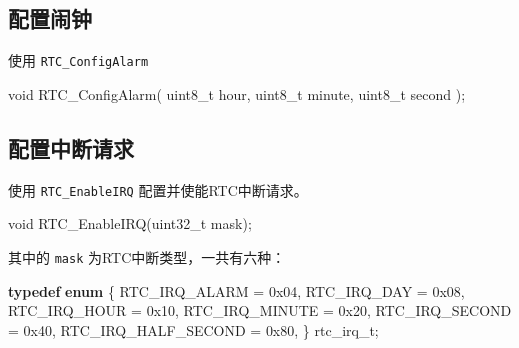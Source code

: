 \documentclass[
  12pt,
]{book}
\newenvironment{Shaded}{\begin{snugshade}}{\end{snugshade}}
\newcommand{\BaseNTok}[1]{\textcolor[rgb]{0.00,0.00,0.81}{#1}}
\newcommand{\DataTypeTok}[1]{\textcolor[rgb]{0.13,0.29,0.53}{#1}}
\newcommand{\KeywordTok}[1]{\textcolor[rgb]{0.13,0.29,0.53}{\textbf{#1}}}
\newcommand{\NormalTok}[1]{#1}
\begin{document}
\hypertarget{ux914dux7f6eux95f9ux949f}{%
\subsection{配置闹钟}\label{ux914dux7f6eux95f9ux949f}}

使用 \texttt{RTC\_ConfigAlarm}

\begin{Shaded}
\begin{Highlighting}[]
\DataTypeTok{void}\NormalTok{ RTC_ConfigAlarm(}
  \DataTypeTok{uint8_t}\NormalTok{ hour, }
  \DataTypeTok{uint8_t}\NormalTok{ minute, }
  \DataTypeTok{uint8_t}\NormalTok{ second}
\NormalTok{  );}
\end{Highlighting}
\end{Shaded}

\hypertarget{ux914dux7f6eux4e2dux65adux8bf7ux6c42-1}{%
\subsection{配置中断请求}\label{ux914dux7f6eux4e2dux65adux8bf7ux6c42-1}}

使用 \texttt{RTC\_EnableIRQ} 配置并使能RTC中断请求。

\begin{Shaded}
\begin{Highlighting}[]
\DataTypeTok{void}\NormalTok{ RTC_EnableIRQ(}\DataTypeTok{uint32_t}\NormalTok{ mask);}
\end{Highlighting}
\end{Shaded}

其中的 \texttt{mask} 为RTC中断类型，一共有六种：

\begin{Shaded}
\begin{Highlighting}[]
\KeywordTok{typedef} \KeywordTok{enum}
\NormalTok{\{}
\NormalTok{    RTC_IRQ_ALARM = }\BaseNTok{0x04}\NormalTok{,}
\NormalTok{    RTC_IRQ_DAY = }\BaseNTok{0x08}\NormalTok{,}
\NormalTok{    RTC_IRQ_HOUR = }\BaseNTok{0x10}\NormalTok{,}
\NormalTok{    RTC_IRQ_MINUTE = }\BaseNTok{0x20}\NormalTok{,}
\NormalTok{    RTC_IRQ_SECOND = }\BaseNTok{0x40}\NormalTok{,}
\NormalTok{    RTC_IRQ_HALF_SECOND = }\BaseNTok{0x80}\NormalTok{,}
\NormalTok{\} rtc_irq_t;}
\end{Highlighting}
\end{Shaded}
\end{document}

